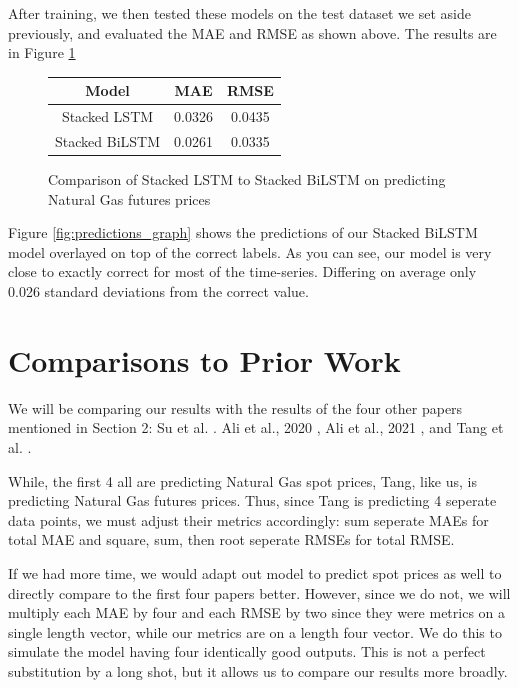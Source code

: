\documentclass[final]{cvpr}
\begin{document}
    After training, we then tested these models on the test dataset we set aside
    previously, and evaluated the MAE and RMSE as shown above. The results are 
    in Figure \ref{fig:results}

    \begin{figure}[h]
        \caption{Comparison of Stacked LSTM to Stacked BiLSTM on predicting
            Natural Gas futures prices}
        \center
        \begin{tabular}{| c || c | c |}
            \hline
            Model & MAE & RMSE\\
            \hline
            \hline
            Stacked LSTM   & 0.0326 & 0.0435\\
            Stacked BiLSTM & 0.0261 & 0.0335\\
            \hline
        \end{tabular}
        \label{fig:results}
    \end{figure}
 
    Figure \ref{fig:predictions_graph} shows the predictions of our Stacked 
    BiLSTM model overlayed on top of the correct labels. As you can see, our 
    model is very close to exactly correct for most of the time-series. 
    Differing on average only 0.026 standard deviations from the correct value.

    
\section{Comparisons to Prior Work}

    We will be comparing our results with the results of the four other papers 
    mentioned in Section 2: Su et al. \cite{su}.  Ali et al., 2020
    \cite{ali2020}, Ali et al., 2021 \cite{ali2021}, and Tang et al.
    \cite{tang}.

    While, the first 4 all are predicting Natural Gas spot prices, Tang, like 
    us, is predicting Natural Gas futures prices. Thus, since Tang is 
    predicting 4 seperate data points, we must adjust their metrics accordingly:
    sum seperate MAEs for total MAE and square, sum, then root seperate RMSEs 
    for total RMSE.

    If we had more time, we would adapt out model to predict spot prices as well
    to directly compare to the first four papers better. However, since we do 
    not, we will multiply each MAE by four and each RMSE by two since they were
    metrics on a single length vector, while our metrics are on a length four
    vector. We do this to simulate the model having four identically good 
    outputs. This is not a perfect substitution by a long shot, but it allows
    us to compare our results more broadly.
\end{document}
